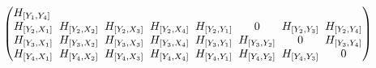 \documentclass[pdftex]{sigma}
\numberwithin{equation}{section}
\theoremstyle{definition}
\newcommand{\0}{\boldsymbol{0}}
\begin{document}
\begin{gather*}
\begin{pmatrix}
H_{[Y_1, Y_4]}
\\
H_{[Y_2, X_1]} \hspace{-2.3pt}&\hspace{-2.3pt} H_{[Y_2, X_2]} \hspace{-2.3pt}&\hspace{-2.3pt} H_{[Y_2, X_3]} \hspace{-2.3pt}&\hspace{-2.3pt} H_{[Y_2, X_4]} \hspace{-2.3pt}&\hspace{-2.3pt} H_{[Y_2, Y_1]} \hspace{-2.3pt}&\hspace{-2.3pt} 0 \hspace{-2.3pt}&\hspace{-2.3pt} H_{[Y_2, Y_3]} \hspace{-2.3pt}&\hspace{-2.3pt}
H_{[Y_2, Y_4]}
\\
H_{[Y_3, X_1]} \hspace{-2.3pt}&\hspace{-2.3pt} H_{[Y_3, X_2]} \hspace{-2.3pt}&\hspace{-2.3pt} H_{[Y_3, X_3]} \hspace{-2.3pt}&\hspace{-2.3pt} H_{[Y_3, X_4]} \hspace{-2.3pt}&\hspace{-2.3pt} H_{[Y_3, Y_1]} \hspace{-2.3pt}&\hspace{-2.3pt} H_{[Y_3, Y_2]} \hspace{-2.3pt}&\hspace{-2.3pt} 0 \hspace{-2.3pt}&\hspace{-2.3pt}
H_{[Y_3, Y_4]}
\\
H_{[Y_4, X_1]} \hspace{-2.3pt}&\hspace{-2.3pt} H_{[Y_4, X_2]} \hspace{-2.3pt}&\hspace{-2.3pt} H_{[Y_4, X_3]} \hspace{-2.3pt}&\hspace{-2.3pt} H_{[Y_4, X_4]} \hspace{-2.3pt}&\hspace{-2.3pt} H_{[Y_4, Y_1]} \hspace{-2.3pt}&\hspace{-2.3pt} H_{[Y_4, Y_2]} \hspace{-2.3pt}&\hspace{-2.3pt} H_{[Y_4, Y_3]} \hspace{-2.3pt}&\hspace{-2.3pt} 0

\end{pmatrix}
\end{gather*}
\end{document}
